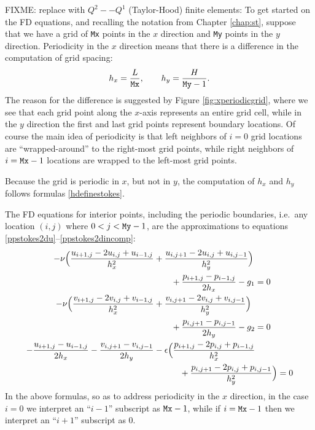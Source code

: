 FIXME: replace with $Q^2--Q^1$ (Taylor-Hood) finite elements:  To get started on the FD equations, and recalling the notation from Chapter \ref{chap:st}, suppose that we have a grid of \texttt{Mx} points in the $x$ direction and \texttt{My} points in the $y$ direction.  Periodicity in the $x$ direction means that there is a difference in the computation of grid spacing:
\begin{equation}
h_x = \frac{L}{\text{\texttt{Mx}}}, \qquad h_y = \frac{H}{\text{\texttt{My}}-1}. \label{hdefinestokes}
\end{equation}
The reason for the difference is suggested by Figure \ref{fig:xperiodicgrid}, where we see that each grid point along the $x$-axis represents an entire grid cell, while in the $y$ direction the first and last grid points represent boundary locations.  Of course the main idea of periodicity is that left neighbors of $i=0$ grid locations are ``wrapped-around'' to the right-most grid points, while right neighbors of $i=\text{\texttt{Mx}}-1$ locations are wrapped to the left-most grid points.

\begin{marginfigure}

\caption{Because the grid is periodic in $x$, but not in $y$, the computation of $h_x$ and $h_y$ follows formulas \eqref{hdefinestokes}.}
\label{fig:xperiodicgrid}
\end{marginfigure}

The FD equations for interior points, including the periodic boundaries, i.e.~any location $(i,j)$ where $0 < j < \text{\texttt{My}}-1$, are the approximations to equations \eqref{ppstokes2du}--\eqref{ppstokes2dincomp}:
\begin{align}
-\nu \Big(\frac{u_{i+1,j} - 2 u_{i,j} + u_{i-1,j}}{h_x^2} &+ \frac{u_{i,j+1} - 2 u_{i,j} + u_{i,j-1}}{h_y^2}\Big) \notag \\
&\qquad + \frac{p_{i+1,j}-p_{i-1,j}}{2h_x} - g_1 = 0 \label{fdstokes2du} \\
-\nu \Big(\frac{v_{i+1,j} - 2 v_{i,j} + v_{i-1,j}}{h_x^2} &+ \frac{v_{i,j+1} - 2 v_{i,j} + v_{i,j-1}}{h_y^2}\Big) \notag \\
&\qquad + \frac{p_{i,j+1}-p_{i,j-1}}{2h_y} - g_2 = 0 \label{fdstokes2dv} \\
- \frac{u_{i+1,j}-u_{i-1,j}}{2h_x} - \frac{v_{i,j+1}-v_{i,j-1}}{2h_y} &- \epsilon \Big(\frac{p_{i+1,j} - 2 p_{i,j} + p_{i-1,j}}{h_x^2} \notag \\
&\qquad\quad + \frac{p_{i,j+1} - 2 p_{i,j} + p_{i,j-1}}{h_y^2}\Big) = 0 \label{fdstokes2dincomp}
\end{align}
In the above formulas, so as to address periodicity in the $x$ direction, in the case $i=0$ we interpret an ``$i-1$'' subscript as $\text{\texttt{Mx}}-1$, while if $i=\text{\texttt{Mx}}-1$ then we interpret an ``$i+1$'' subscript as $0$.

